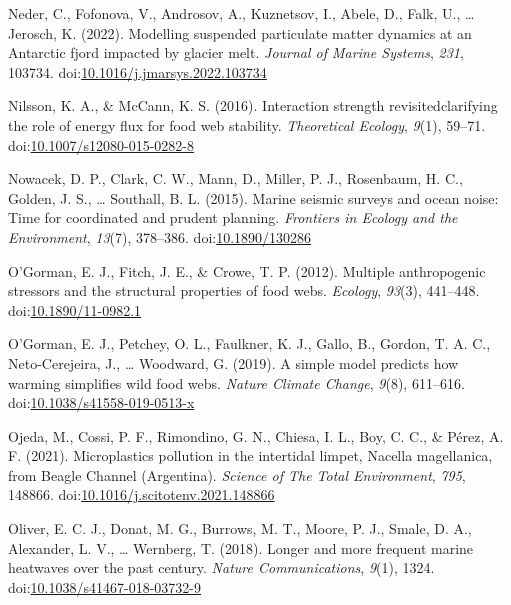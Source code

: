 \documentclass[
]{article}
\newlength{\cslhangindent}
\newlength{\cslentryspacingunit} %
\newenvironment{CSLReferences}[2] %
 {%
  \setlength{\parindent}{0pt}
  \ifodd #1
  \let\oldpar\par
  \def\par{\hangindent=\cslhangindent\oldpar}
  \fi
  \setlength{\parskip}{#2\cslentryspacingunit}
 }%
 {}
\begin{document}
\begin{CSLReferences}{1}{0}
\leavevmode{}%
Neder, C., Fofonova, V., Androsov, A., Kuznetsov, I., Abele, D., Falk,
U., \ldots{} Jerosch, K. (2022). Modelling suspended particulate matter
dynamics at an {Antarctic} fjord impacted by glacier melt. \emph{Journal
of Marine Systems}, \emph{231}, 103734.
doi:\href{https://doi.org/10.1016/j.jmarsys.2022.103734}{10.1016/j.jmarsys.2022.103734}

\leavevmode{}%
Nilsson, K. A., \& McCann, K. S. (2016). Interaction strength
revisited\textemdash clarifying the role of energy flux for food web
stability. \emph{Theoretical Ecology}, \emph{9}(1), 59--71.
doi:\href{https://doi.org/10.1007/s12080-015-0282-8}{10.1007/s12080-015-0282-8}

\leavevmode{}%
Nowacek, D. P., Clark, C. W., Mann, D., Miller, P. J., Rosenbaum, H. C.,
Golden, J. S., \ldots{} Southall, B. L. (2015). Marine seismic surveys
and ocean noise: Time for coordinated and prudent planning.
\emph{Frontiers in Ecology and the Environment}, \emph{13}(7), 378--386.
doi:\href{https://doi.org/10.1890/130286}{10.1890/130286}

\leavevmode{}%
O'Gorman, E. J., Fitch, J. E., \& Crowe, T. P. (2012). Multiple
anthropogenic stressors and the structural properties of food webs.
\emph{Ecology}, \emph{93}(3), 441--448.
doi:\href{https://doi.org/10.1890/11-0982.1}{10.1890/11-0982.1}

\leavevmode{}%
O'Gorman, E. J., Petchey, O. L., Faulkner, K. J., Gallo, B., Gordon, T.
A. C., Neto-Cerejeira, J., \ldots{} Woodward, G. (2019). A simple model
predicts how warming simplifies wild food webs. \emph{Nature Climate
Change}, \emph{9}(8), 611--616.
doi:\href{https://doi.org/10.1038/s41558-019-0513-x}{10.1038/s41558-019-0513-x}

\leavevmode{}%
Ojeda, M., Cossi, P. F., Rimondino, G. N., Chiesa, I. L., Boy, C. C., \&
Pérez, A. F. (2021). Microplastics pollution in the intertidal limpet,
{Nacella} magellanica, from {Beagle Channel} ({Argentina}).
\emph{Science of The Total Environment}, \emph{795}, 148866.
doi:\href{https://doi.org/10.1016/j.scitotenv.2021.148866}{10.1016/j.scitotenv.2021.148866}

\leavevmode{}%
Oliver, E. C. J., Donat, M. G., Burrows, M. T., Moore, P. J., Smale, D.
A., Alexander, L. V., \ldots{} Wernberg, T. (2018). Longer and more
frequent marine heatwaves over the past century. \emph{Nature
Communications}, \emph{9}(1), 1324.
doi:\href{https://doi.org/10.1038/s41467-018-03732-9}{10.1038/s41467-018-03732-9}


\end{CSLReferences}
\end{document}
